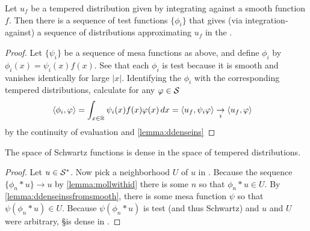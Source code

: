     \begin{lemma}
      \label{lemma:ddenseinssfromsmooth}
      Let $u_f$ be a tempered distribution given by integrating against a smooth function $f$.
      Then there is a sequence of test functions $\{\phi_i\}$ that gives (via integration-against) a sequence of distributions approximating $u_f$ in the \ws.
    \end{lemma}
    \begin{proof}
      Let $\{\psi_i\}$ be a sequence of mesa functions as above, and define $\phi_i$ by $\phi_i(x) = \psi_i(x)f(x)$.
      See that each $\phi_i$ is test because it is smooth and vanishes identically for large $|x|$.
      Identifying the $\phi_i$ with the corresponding tempered distributions, calculate for any $\varphi\in\S$
      \begin{align*}
        \langle \phi_i, \varphi\rangle
        &= \int_{x\in\R} \psi_i(x)f(x)\varphi(x)\,dx
        = \langle u_f, \psi_i\varphi\rangle
        \underset{i}{\rightarrow} \langle u_f, \varphi\rangle
      \end{align*}
      by the continuity of evaluation and \cref{lemma:ddenseins}
    \end{proof}

    \begin{thm}
      \label{thm:sdenseinss}
      The space of Schwartz functions is dense in the space of tempered distributions.
    \end{thm}
    \begin{proof}
      Let $u\in\SS$.
      Now pick a neighborhood $U$ of $u$ in \SS.
      Because the sequence $\{\phi_n*u\}\rightarrow u$ by \cref{lemma:mollwithid} there is some $n$ so that $\phi_n*u\in U$.
      By \cref{lemma:ddenseinssfromsmooth}, there is some mesa function $\psi$ so that $\psi(\phi_n*u)\in U$.
      Because $\psi(\phi_n*u)$ is test (and thus Schwartz) and $u$ and $U$ were arbitrary, \S is dense in \SS.
    \end{proof}


